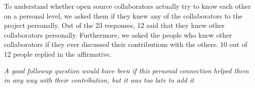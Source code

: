 To understand whether open source collaborators actually try to know each other on a personal level, we asked them if they knew any of the collaborators to the project personally. Out of the 23 responses, 12 said that they knew other collaborators personally. Furthermore, we asked the people who knew other collaborators if they ever discussed their contributions with the others. 10 out of 12 people replied in the affirmative. 

{\it A good followup question would have been if this personal connection helped them in any way with their contribution, but it was too late to add it}


